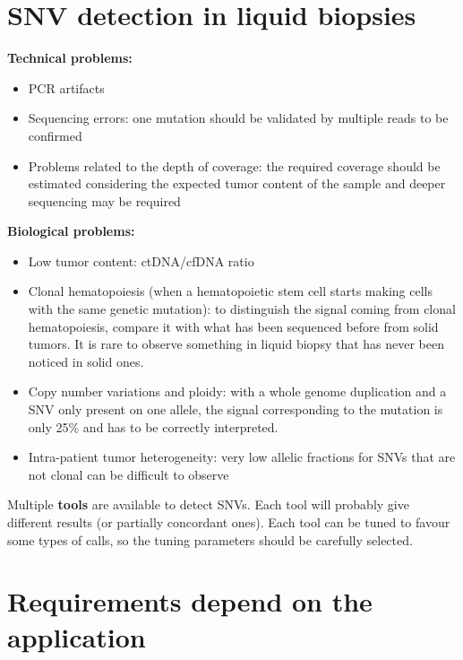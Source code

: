 \section{SNV detection in liquid biopsies}

\textbf{Technical problems:}
\begin{itemize}
    \item PCR artifacts 
    \item Sequencing errors: one mutation should be validated by multiple reads to be confirmed
    \item Problems related to the depth of coverage: the required coverage should be estimated considering the expected tumor content of the sample and deeper sequencing may be required
\end{itemize}
\textbf{Biological problems:}
\begin{itemize}
    \item Low tumor content: ctDNA/cfDNA ratio
    \item Clonal hematopoiesis (when a hematopoietic stem cell starts making cells with the same genetic mutation): to distinguish the signal coming from clonal hematopoiesis, compare it with what has been sequenced before from solid tumors. It is rare to observe something in liquid biopsy that has never been noticed in solid ones.
    \item Copy number variations and ploidy: with a whole genome duplication and a SNV only present on one allele, the signal corresponding to the mutation is only 25\% and has to be correctly interpreted.
    \item Intra-patient tumor heterogeneity: very low allelic fractions for SNVs that are not clonal can be difficult to observe
\end{itemize}

Multiple \textbf{tools} are available to detect SNVs. Each tool will probably give different results (or partially concordant ones). Each tool can be tuned to favour some types of calls, so the tuning parameters should be carefully selected.

\section{Requirements depend on the application}

